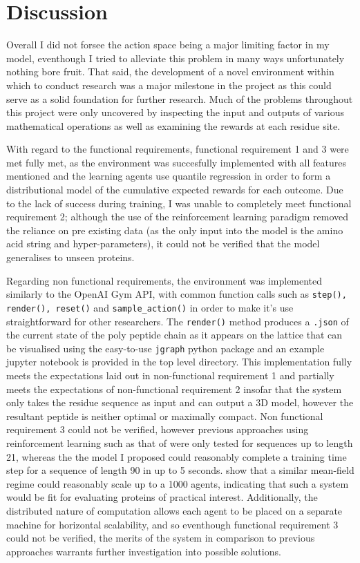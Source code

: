 \section{Discussion}
Overall I did not forsee the action space being a major limiting factor in
my model, eventhough I tried to alleviate this problem in many ways
unfortunately nothing bore fruit. That said, the development
of a novel environment within which to conduct research was 
a major milestone in the project as this could serve as a solid
foundation for further research. Much of the problems throughout
this project were only uncovered by inspecting the input and outputs of various mathematical 
operations as well as examining the rewards at each residue site.

With regard to the functional requirements, functional requirement 1
and 3 were met fully met, as the environment was succesfully implemented
with all features mentioned and the learning agents use quantile regression
in order to form a distributional model of the cumulative expected rewards for
each outcome. Due to the lack of success during training, I was unable to completely meet
functional requirement 2; although the use of the reinforcement learning
paradigm removed the reliance on pre existing data (as the only input into the model
is the amino acid string and hyper-parameters), it could not be verified that
the model generalises to unseen proteins.

Regarding non functional requirements, the environment was implemented similarly
to the OpenAI Gym API, with common function calls such as \texttt{step(), render(),
reset()} and \texttt{sample_action()} in order to make it's use straightforward
for other researchers. The \texttt{render()} method produces a \texttt{.json} 
of the current state of the poly peptide chain as it appears on the lattice 
that can be visualised using the easy-to-use \texttt{jgraph} python package and
an example jupyter notebook is provided in the top level directory. This implementation
fully meets the expectations laid out in non-functional requirement 1 and partially
meets the expectations of non-functional requirement 2 insofar that the system
only takes the residue sequence as input and can output a 3D model, however
the resultant peptide is neither optimal or maximally compact. Non functional
requirement 3 could not be verified, however previous approaches using reinforcement learning
such as that of \cite{Wu2019} were only tested for sequences up to length 21, whereas
the the model I proposed could reasonably complete a training time step for a sequence
of length 90 in up to 5 seconds. \cite{Mguni2018} show that a similar mean-field 
regime could reasonably scale up to a 1000 agents, indicating that such a system
would be fit for evaluating proteins of practical interest. Additionally,
the distributed nature of computation allows each agent to be placed on a separate 
machine for horizontal scalability, and so eventhough functional requirement 3 could 
not be verified, the merits of the system in comparison to previous approaches
warrants further investigation into possible solutions.

